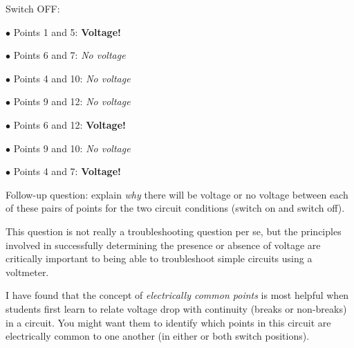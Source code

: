 \vskip 10pt

Switch OFF:

\medskip
\goodbreak
\item{$\bullet$} Points 1 and 5: {\bf Voltage!}
\item{$\bullet$} Points 6 and 7: {\it No voltage}
\item{$\bullet$} Points 4 and 10: {\it No voltage}
\item{$\bullet$} Points 9 and 12: {\it No voltage}
\item{$\bullet$} Points 6 and 12: {\bf Voltage!}
\item{$\bullet$} Points 9 and 10: {\it No voltage}
\item{$\bullet$} Points 4 and 7: {\bf Voltage!}
\medskip

\vskip 10pt

Follow-up question: explain {\it why} there will be voltage or no voltage between each of these pairs of points for the two circuit conditions (switch on and switch off).







This question is not really a troubleshooting question per se, but the principles involved in successfully determining the presence or absence of voltage are critically important to being able to troubleshoot simple circuits using a voltmeter.

I have found that the concept of {\it electrically common points} is most helpful when students first learn to relate voltage drop with continuity (breaks or non-breaks) in a circuit.  You might want them to identify which points in this circuit are electrically common to one another (in either or both switch positions).




